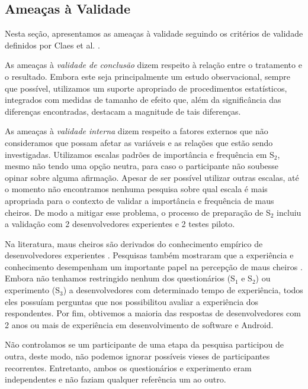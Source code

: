 \subsection{Ameaças à Validade}
\label{ameacas}

Nesta seção, apresentamos as ameaças à validade seguindo os critérios de validade definidos por Claes et al. \cite{Wohlin:00}.

As ameaças à \textit{validade de conclusão} dizem respeito à relação entre o tratamento e o resultado. Embora este seja principalmente um estudo observacional, sempre que possível, utilizamos um suporte apropriado de procedimentos estatísticos, integrados com medidas de tamanho de efeito que, além da significância das diferenças encontradas, destacam a magnitude de tais diferenças. 

As ameaças à \textit{validade interna} dizem respeito a fatores externos que não consideramos que possam afetar as variáveis e as relações que estão sendo investigadas. Utilizamos escalas padrões de importância e frequência em S$_2$, mesmo não tendo uma opção neutra, para caso o participante não soubesse opinar sobre alguma afirmação. Apesar de ser possível utilizar outras escalas, até o momento não encontramos nenhuma pesquisa sobre qual escala é mais apropriada para o contexto de validar a importância e frequência de maus cheiros. De modo a mitigar esse problema, o processo de preparação de S$_2$ incluiu a validação com 2 desenvolvedores experientes e 2 testes piloto.

Na literatura, maus cheiros são derivados do conhecimento empírico de desenvolvedores experientes \cite{Refactoring:99, Riel:96, CleanCode:08, Webster:95}. Pesquisas também mostraram que a experiência e conhecimento desempenham um importante papel na percepção de maus cheiros \cite{Palomba_Do_2014, Taibi:17}. Embora não tenhamos restringido nenhum dos questionários (S$_1$ e S$_2$) ou experimento (S$_3$) a desenvolvedores com determinado tempo de experiência, todos eles possuíam perguntas que nos possibilitou avaliar a experiência dos respondentes. Por fim, obtivemos a maioria das respostas de desenvolvedores com 2 anos ou mais de experiência em desenvolvimento de software e Android.

Não controlamos se um participante de uma etapa da pesquisa participou de outra, deste modo, não podemos ignorar possíveis vieses de participantes recorrentes. Entretanto, ambos os questionários e experimento eram independentes e não faziam qualquer referência um ao outro.

